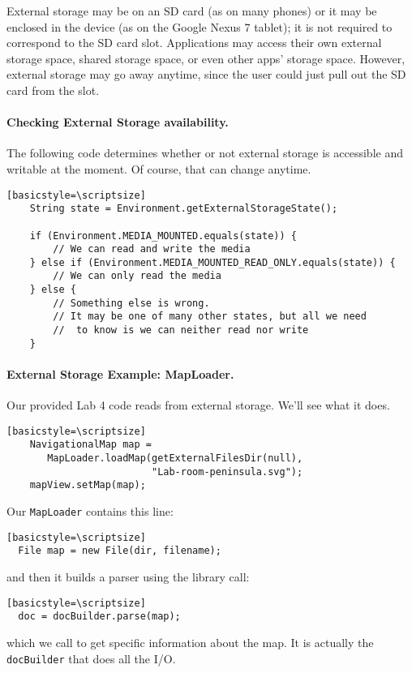 External storage may be on an SD card (as on many phones) or it may be
enclosed in the device (as on the Google Nexus 7 tablet); it is not
required to correspond to the SD card slot. Applications may access
their own external storage space, shared storage space, or even other
apps' storage space. However, external storage may go away anytime, since
the user could just pull out the SD card from the slot.

\paragraph{Checking External Storage availability.} The following
code determines whether or not external storage is accessible and
writable at the moment. Of course, that can change anytime.
\begin{verbatim}[basicstyle=\scriptsize]
    String state = Environment.getExternalStorageState();

    if (Environment.MEDIA_MOUNTED.equals(state)) {
        // We can read and write the media
    } else if (Environment.MEDIA_MOUNTED_READ_ONLY.equals(state)) {
        // We can only read the media
    } else {
        // Something else is wrong. 
        // It may be one of many other states, but all we need
        //  to know is we can neither read nor write
    }
\end{verbatim}

\paragraph{External Storage Example: MapLoader.} Our provided 
Lab 4 code reads from external storage. We'll see what it does.
\begin{verbatim}[basicstyle=\scriptsize]
    NavigationalMap map = 
       MapLoader.loadMap(getExternalFilesDir(null), 
                         "Lab-room-peninsula.svg");
    mapView.setMap(map);
\end{verbatim}

Our {\tt MapLoader} contains this line:
\begin{verbatim}[basicstyle=\scriptsize]
  File map = new File(dir, filename);
\end{verbatim} 
and then it builds a parser using the library call:
\begin{verbatim}[basicstyle=\scriptsize]
  doc = docBuilder.parse(map);
\end{verbatim}
which we call to get specific information about the map. It is
actually the {\tt docBuilder} that does all the I/O.

